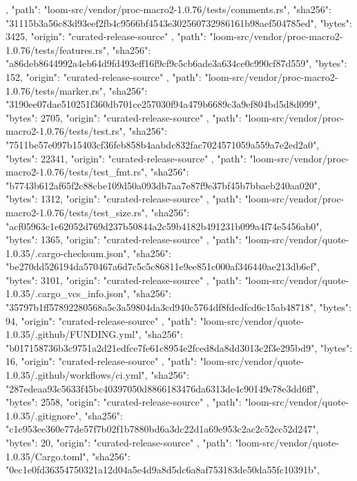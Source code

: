 {{    },
    {
      "path": "loom-src/vendor/proc-macro2-1.0.76/tests/comments.rs",
      "sha256": "31115b3a56c83d93eef2fb4c9566bf4543e302560732986161b98aef504785ed",
      "bytes": 3425,
      "origin": "curated-release-source"
    },
    {
      "path": "loom-src/vendor/proc-macro2-1.0.76/tests/features.rs",
      "sha256": "a86deb8644992a4eb64d9fd493eff16f9cf9c5cb6ade3a634ce0c990cf87d559",
      "bytes": 152,
      "origin": "curated-release-source"
    },
    {
      "path": "loom-src/vendor/proc-macro2-1.0.76/tests/marker.rs",
      "sha256": "3190ee07dae510251f360db701ce257030f94a479b6689c3a9ef804bd5d8d099",
      "bytes": 2705,
      "origin": "curated-release-source"
    },
    {
      "path": "loom-src/vendor/proc-macro2-1.0.76/tests/test.rs",
      "sha256": "7511be57e097b15403cf36feb858b4aabdc832fac7024571059a559a7e2ed2a0",
      "bytes": 22341,
      "origin": "curated-release-source"
    },
    {
      "path": "loom-src/vendor/proc-macro2-1.0.76/tests/test_fmt.rs",
      "sha256": "b7743b612af65f2c88cbe109d50a093db7aa7e87f9e37bf45b7bbaeb240aa020",
      "bytes": 1312,
      "origin": "curated-release-source"
    },
    {
      "path": "loom-src/vendor/proc-macro2-1.0.76/tests/test_size.rs",
      "sha256": "acf05963c1e62052d769d237b50844a2c59b4182b491231b099a4f74e5456ab0",
      "bytes": 1365,
      "origin": "curated-release-source"
    },
    {
      "path": "loom-src/vendor/quote-1.0.35/.cargo-checksum.json",
      "sha256": "be270dd526194da570467a6d7c5c5c86811e9ee851c000af346440ae213db6ef",
      "bytes": 3101,
      "origin": "curated-release-source"
    },
    {
      "path": "loom-src/vendor/quote-1.0.35/.cargo_vcs_info.json",
      "sha256": "35797b1ff57892280568a5c3a59804da3cd940c5764df8fdedfcd6c15ab48718",
      "bytes": 94,
      "origin": "curated-release-source"
    },
    {
      "path": "loom-src/vendor/quote-1.0.35/.github/FUNDING.yml",
      "sha256": "b017158736b3c9751a2d21edfce7fe61c8954e2fced8da8dd3013c2f3e295bd9",
      "bytes": 16,
      "origin": "curated-release-source"
    },
    {
      "path": "loom-src/vendor/quote-1.0.35/.github/workflows/ci.yml",
      "sha256": "287edeaa93c5633f45bc40397050d8866183476da6313de4c90149c78e3dd6ff",
      "bytes": 2558,
      "origin": "curated-release-source"
    },
    {
      "path": "loom-src/vendor/quote-1.0.35/.gitignore",
      "sha256": "c1e953ee360e77de57f7b02f1b7880bd6a3dc22d1a69e953c2ac2c52cc52d247",
      "bytes": 20,
      "origin": "curated-release-source"
    },
    {
      "path": "loom-src/vendor/quote-1.0.35/Cargo.toml",
      "sha256": "0ec1e0fd36354750321a12d04a5e4d9a8d5dc6a8af753183de50da55fc10391b",
}}
